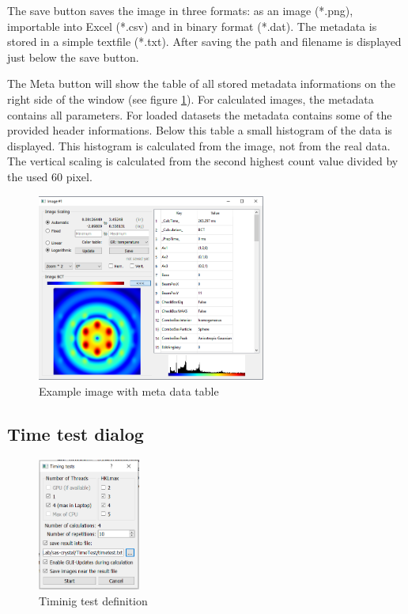 \documentclass[11pt]{article} %
\begin{document}
The save button saves the image in three formats: as an image (*.png), importable into Excel (*.csv) and in binary format (*.dat). The metadata is stored in a simple textfile (*.txt). After saving the path and filename is displayed just below the save button.

The Meta button will show the table of all stored metadata informations on the right side of the window (see figure \ref{fig:imagemeta}). For calculated images, the metadata contains all parameters. For loaded datasets the metadata contains some of the provided header informations. Below this table a small histogram of the data is displayed. This histogram is calculated from the image, not from the real data. The vertical scaling is calculated from the second highest count value divided by the used 60 pixel.
\begin{figure}[H]
 \centering
 \includegraphics[width=0.67\textwidth]{img-bct-meta.png}
 \caption{Example image with meta data table}
 \label{fig:imagemeta}
\end{figure}


\subsection{Time test dialog}

\begin{figure}
  \begin{center}
    \includegraphics[width=0.3\textwidth]{timing_test.png}
  \end{center}
 \caption{Timinig test definition}
\end{figure}
\end{document}

